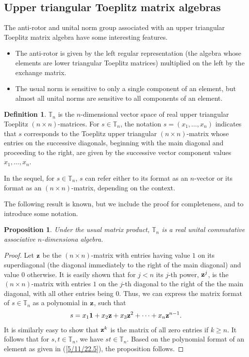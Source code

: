 \documentclass{amsart}
\numberwithin{equation}{section}
\newtheorem{proposition}[theorem]{Proposition}
\theoremstyle{definition}
\newtheorem{definition}[theorem]{Definition}
\numberwithin{theorem}{section}
\begin{document}
\subsection{Upper triangular Toeplitz matrix algebras}

The anti-rotor and unital norm group associated with an upper triangular Toeplitz matrix algebra have some interesting features.
\begin{itemize}\item The anti-rotor is given by the left regular representation (the algebra whose elements are lower triangular Toeplitz matrices) multiplied on the left by the exchange matrix. \item The usual norm is sensitive to only a single component of an element, but almost all unital norms are sensitive to all components of an element.\end{itemize}


 \begin{definition}\label{5/4/22.1} $\mathbb{T}_n$ is the $n$-dimensional vector space of real upper triangular Toeplitz $(n\times n)$-matrices. For $s\in \mathbb{T}_n$, the notation $s=(x_1,\dots,x_n)$ indicates that $s$ corresponds to the Toeplitz upper triangular $(n\times n)$-matrix whose entries on the successive diagonals, beginning with the main diagonal and proceeding to the right, are given by the successive vector component values $x_1,\dots,x_n$.   
\end{definition}

In the sequel, for $s\in \mathbb{T}_n$, $s$ can refer either to its format as an $n$-vector or its format as an $(n\times n)$-matrix, depending on the context.


The following result is known, but we include the proof for completeness, and to introduce some notation.  



 \begin{proposition}\label{5/10/22.1} Under the usual matrix product, $\mathbb{T}_n$ is a real unital commutative associative $n$-dimensiona algebra.\end{proposition} 
 
 \begin{proof}
Let ${\bf z}$ be the $(n \times n)$-matrix with entries having value $1$ on its superdiagonal  (the diagonal immediately to the right of the main diagonal) and value $0$ otherwise.  It is easily shown that for $j<n$ its $j$-th power, ${\bf z}^j$, is the $(n\times n)$-matrix with entries $1$ on the $j$-th diagonal to the right of the the main diagonal, with all other entries being $0$.   Thus, we can express the matrix format of $s\in\mathbb{T}_n$ as a polynomial in ${\bf z}$, such that
\begin{equation}\label{5/11/22.5} s = x_1 {\bf 1} + x_2 {\bf z} + x_3 {\bf z}^2 + \cdots + x_n {\bf z}^{n-1}.\end{equation}  It is similarly easy to show that ${\bf z}^k$ is the matrix of all zero entries if $k\ge n$.  It follows that for $s,t\in \mathbb{T}_n$, we have $st\in \mathbb{T}_n$.   Based on the polynomial format of an element as given in (\ref{5/11/22.5}), the proposition follows.
 \end{proof}
 
\end{document}
